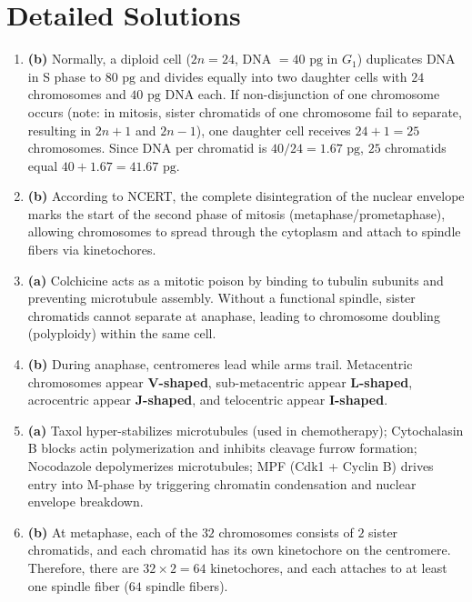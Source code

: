 \documentclass[11pt,a4paper]{article}
\begin{document}
\section*{Detailed Solutions}

\begin{enumerate}[label=\textbf{\arabic*.}, leftmargin=*]

\item \textbf{(b)} Normally, a diploid cell ($2n = 24$, DNA $= 40\text{ pg}$ in $G_1$) duplicates DNA in S phase to $80\text{ pg}$ and divides equally into two daughter cells with $24$ chromosomes and $40\text{ pg}$ DNA each. If non-disjunction of one chromosome occurs (note: in mitosis, sister chromatids of one chromosome fail to separate, resulting in $2n+1$ and $2n-1$), one daughter cell receives $24 + 1 = 25$ chromosomes. Since DNA per chromatid is $40/24 = 1.67\text{ pg}$, $25$ chromatids equal $40 + 1.67 = 41.67\text{ pg}$.

\item \textbf{(b)} According to NCERT, the complete disintegration of the nuclear envelope marks the start of the second phase of mitosis (metaphase/prometaphase), allowing chromosomes to spread through the cytoplasm and attach to spindle fibers via kinetochores.

\item \textbf{(a)} Colchicine acts as a mitotic poison by binding to tubulin subunits and preventing microtubule assembly. Without a functional spindle, sister chromatids cannot separate at anaphase, leading to chromosome doubling (polyploidy) within the same cell.

\item \textbf{(b)} During anaphase, centromeres lead while arms trail. Metacentric chromosomes appear \textbf{V-shaped}, sub-metacentric appear \textbf{L-shaped}, acrocentric appear \textbf{J-shaped}, and telocentric appear \textbf{I-shaped}.

\item \textbf{(a)} Taxol hyper-stabilizes microtubules (used in chemotherapy); Cytochalasin B blocks actin polymerization and inhibits cleavage furrow formation; Nocodazole depolymerizes microtubules; MPF (Cdk1 + Cyclin B) drives entry into M-phase by triggering chromatin condensation and nuclear envelope breakdown.

\item \textbf{(b)} At metaphase, each of the $32$ chromosomes consists of $2$ sister chromatids, and each chromatid has its own kinetochore on the centromere. Therefore, there are $32 \times 2 = 64$ kinetochores, and each attaches to at least one spindle fiber ($64$ spindle fibers).


\end{enumerate}
\end{document}
